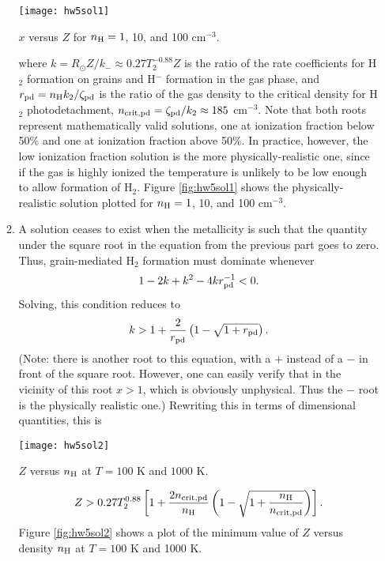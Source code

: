 \begin{enumerate}
\begin{enumerate}
\begin{marginfigure}
\texttt{[image: hw5sol1]}
\caption[Solution to problem set~\thesolutionset, problem~\theenumi\theenumii]{
\label{fig:hw5sol1}
$x$ versus $Z$ for $n_{\rm H} = 1$, 10, and 100 cm$^{-3}$.
}
\end{marginfigure}
where $k = R_{\odot} Z/k_{-}\approx 0.27 T_2^{-0.88} Z$ is the ratio of the rate coefficients for H$_2$ formation on grains and H$^-$ formation in the gas phase, and $r_{\rm pd} = n_{\rm H} k_2 / \zeta_{\rm pd}$ is the ratio of the gas density to the critical density for H$_2$ photodetachment, $n_{\rm crit,pd} = \zeta_{\rm pd}/k_2\approx 185$ cm$^{-3}$. Note that both roots represent mathematically valid solutions, one at ionization fraction below 50\% and one at ionization fraction above 50\%. In practice, however, the low ionization fraction solution is the more physically-realistic one, since if the gas is highly ionized the temperature is unlikely to be low enough to allow formation of H$_2$. Figure \ref{fig:hw5sol1} shows the physically-realistic solution plotted for $n_{\rm H} = 1$, 10, and 100 cm$^{-3}$.

\item A solution ceases to exist when the metallicity is such that the quantity under the square root in the equation from the previous part goes to zero. Thus, grain-mediated H$_2$ formation must dominate whenever
\begin{displaymath}
1 - 2k + k^2 - 4 k r_{\rm pd}^{-1} < 0.
\end{displaymath}
Solving, this condition reduces to
\begin{displaymath}
k > 1 + \frac{2}{r_{\rm pd}} \left(1 - \sqrt{1+r_{\rm pd}}\right).
\end{displaymath}
(Note: there is another root to this equation, with a $+$ instead of a $-$ in front of the square root. However, one can easily verify that in the vicinity of this root $x>1$, which is obviously unphysical. Thus the $-$ root is the physically realistic one.) Rewriting this in terms of dimensional quantities, this is
\begin{marginfigure}
\texttt{[image: hw5sol2]}
\caption[Solution to problem set~\thesolutionset, problem~\theenumi\theenumii]{
\label{fig:hw5sol2}
$Z$ versus $n_{\rm H}$ at $T=100$ K and $1000$ K.
}
\end{marginfigure}
\begin{displaymath}
Z > 0.27 T_2^{0.88} \left[1 + \frac{2 n_{\rm crit,pd}}{n_{\rm H}} \left(1 - \sqrt{1+\frac{n_{\rm H}}{n_{\rm crit,pd}}}\right)\right].
\end{displaymath}
Figure \ref{fig:hw5sol2} shows a plot of the minimum value of $Z$ versus density $n_{\rm H}$ at $T=100$ K and 1000 K.


\end{enumerate}
\end{enumerate}
